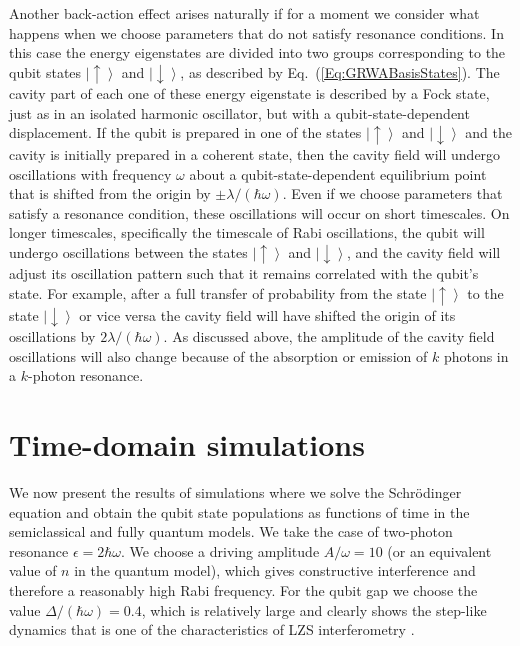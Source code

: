 \documentclass[aps,twocolumn,superscriptaddress]{revtex4}
\newcommand{\ket}[1] {\left| #1 \right\rangle}
\begin{document}
Another back-action effect arises naturally if for a moment we consider what happens when we choose parameters that do not satisfy resonance conditions. In this case the energy eigenstates are divided into two groups corresponding to the qubit states $\ket{\uparrow}$ and $\ket{\downarrow}$, as described by Eq.~(\ref{Eq:GRWABasisStates}). The cavity part of each one of these energy eigenstate is described by a Fock state, just as in an isolated harmonic oscillator, but with a qubit-state-dependent displacement. If the qubit is prepared in one of the states $\ket{\uparrow}$ and $\ket{\downarrow}$ and the cavity is initially prepared in a coherent state, then the cavity field will undergo oscillations with frequency $\omega$ about a qubit-state-dependent equilibrium point that is shifted from the origin by $\pm\lambda/(\hbar\omega)$. Even if we choose parameters that satisfy a resonance condition, these oscillations will occur on short timescales. On longer timescales, specifically the timescale of Rabi oscillations, the qubit will undergo oscillations between the states $\ket{\uparrow}$ and $\ket{\downarrow}$, and the cavity field will adjust its oscillation pattern such that it remains correlated with the qubit's state. For example, after a full transfer of probability from the state $\ket{\uparrow}$ to the state $\ket{\downarrow}$ or vice versa the cavity field will have shifted the origin of its oscillations by $2\lambda/(\hbar\omega)$. As discussed above, the amplitude of the cavity field oscillations will also change because of the absorption or emission of $k$ photons in a $k$-photon resonance.



\section{Time-domain simulations}
\label{Sec:TimeDomainSimulations}

We now present the results of simulations where we solve the Schr\"odinger equation and obtain the qubit state populations as functions of time in the semiclassical and fully quantum models. We take the case of two-photon resonance $\epsilon=2\hbar\omega$. We choose a driving amplitude $A/\omega=10$ (or an equivalent value of $n$ in the quantum model), which gives constructive interference and therefore a reasonably high Rabi frequency. For the qubit gap we choose the value $\Delta/(\hbar\omega)=0.4$, which is relatively large and clearly shows the step-like dynamics that is one of the characteristics of LZS interferometry \cite{Zhou}.
\end{document}
